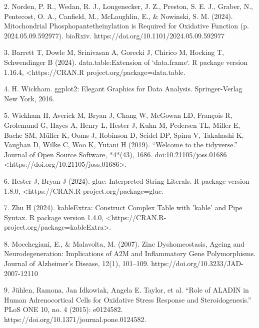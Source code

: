 \documentclass{article}
\begin{document}
\begin{hangparas}{2em}{1}
2. Norden, P. R., Wedan, R. J., Longenecker, J. Z., Preston, S. E. J., Graber, N., Pentecost, O. A., Canfield, M., McLaughlin, E., & Nowinski, S. M. (2024). Mitochondrial Phosphopantetheinylation is Required for Oxidative Function (p. 2024.05.09.592977). bioRxiv. https://doi.org/10.1101/2024.05.09.592977\\
    
\begin{hangparas}{2em}{1}
3. Barrett T, Dowle M, Srinivasan A, Gorecki J, Chirico M, Hocking T, Schwendinger B (2024). data.table:Extension of `data.frame`. R package version 1.16.4, <https://CRAN.R project.org/package=data.table.\\

\begin{hangparas}{2em}{1}
4. H. Wickham. ggplot2: Elegant Graphics for Data Analysis. Springer-Verlag New York, 2016.\\

\begin{hangparas}{2em}{1}
5. Wickham H, Averick M, Bryan J, Chang W, McGowan LD, François R,
Grolemund G, Hayes A, Henry L, Hester J, Kuhn M, Pedersen TL, Miller E, Bache SM, Müller K, Ooms J, Robinson D, Seidel DP, Spinu V, Takahashi K, Vaughan D, Wilke C, Woo K, Yutani H (2019). “Welcome to the tidyverse.” Journal of Open Source Software, *4*(43), 1686. doi:10.21105/joss.01686 <https://doi.org/10.21105/joss.01686>.\\

\begin{hangparas}{2em}{1}
6. Hester J, Bryan J (2024). glue: Interpreted String Literals. R package version 1.8.0,
<https://CRAN.R-project.org/package=glue.\\

\begin{hangparas}{2em}{1}
7. Zhu H (2024). kableExtra: Construct Complex Table with 'kable' and Pipe Syntax. R package version 1.4.0, <https://CRAN.R-project.org/package=kableExtra>.\\

\begin{hangparas}{2em}{1}
8. Mocchegiani, E., & Malavolta, M. (2007). Zinc Dyshomeostasis, Ageing and Neurodegeneration: Implications of A2M and Inflammatory Gene Polymorphisms. Journal of Alzheimer’s Disease, 12(1), 101–109. https://doi.org/10.3233/JAD-2007-12110\\

\begin{hangparas}{2em}{1}
9. Jühlen, Ramona, Jan Idkowiak, Angela E. Taylor, et al. “Role of ALADIN in Human Adrenocortical Cells for Oxidative Stress Response and Steroidogenesis.” PLoS ONE 10, no. 4 (2015): e0124582. https://doi.org/10.1371/journal.pone.0124582.\\


\end{hangparas}
\end{hangparas}
\end{hangparas}
\end{hangparas}
\end{hangparas}
\end{hangparas}
\end{hangparas}
\end{hangparas}
\end{document}
